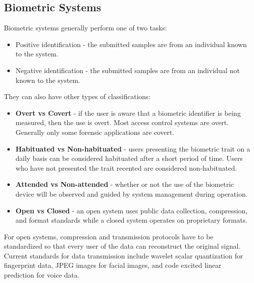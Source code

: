 \documentclass{math}
\begin{document}
\subsection*{Biometric Systems}
Biometric systems generally perform one of two tasks:
\begin{itemize}
  \item Positive identification - the submitted samples are from an individual
    known to the system.
  \item Negative identification - the submitted samples are from an individual
    not known to the system.
\end{itemize}
They can also have other types of classifications:
\begin{itemize}
  \item \textbf{Overt vs Covert} - if the user is aware that a biometric
    identifier is being measured, then the use is overt. Most access control
    systems are overt. Generally only some forensic applications are covert.
  \item \textbf{Habituated vs Non-habituated} - users presenting the biometric
    trait on a daily basis can be considered habituated after a short period of
    time. Users who have not presented the trait recented are considered
    non-habituated.
  \item \textbf{Attended vs Non-attended} - whether or not the use of the
    biometric device will be observed and guided by system management during
    operation.
  \item \textbf{Open vs Closed} - an open system uses public data collection,
    compression, and format standards while a closed system operates on
    proprietary formats.
\end{itemize}
For open systems, compression and transmission protocols have to be
standardized so that every user of the data can reconstruct the original signal.
Current standards for data transmission include wavelet scalar quantization
for fingerprint data, JPEG images for facial images, and code excited linear
prediction for voice data.
\end{document}
